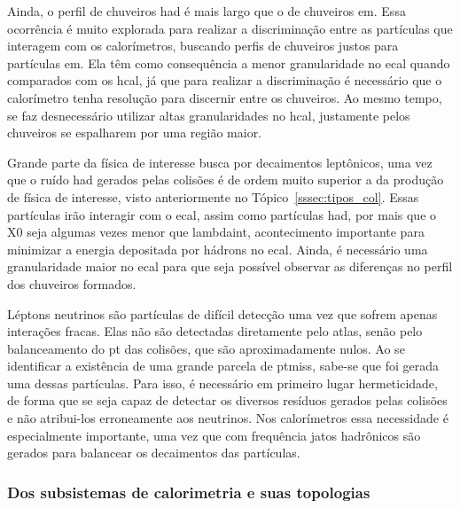 Ainda, o perfil de chuveiros \gls{had} é mais largo que o de chuveiros
\gls{em}. Essa ocorrência é muito explorada para realizar a discriminação 
entre as partículas que interagem com os calorímetros, buscando perfis de chuveiros
justos para partículas \gls{em}. Ela têm como consequência 
a menor granularidade no \gls{ecal} quando comparados com os \gls{hcal}, já que
para realizar a discriminação é necessário que o calorímetro tenha resolução
para discernir entre os chuveiros. Ao mesmo tempo, se faz desnecessário
utilizar altas granularidades no \gls{hcal}, justamente pelos chuveiros se
espalharem por uma região maior.

Grande parte da física de interesse busca por decaimentos
leptônicos, uma vez que o ruído \gls{had} gerados pelas colisões é de ordem
muito superior a da produção de física de interesse, visto anteriormente no
Tópico~\ref{sssec:tipos_col}. Essas partículas irão interagir com o \gls{ecal},
assim como partículas \gls{had}, por mais que o \gls{X0} seja algumas vezes 
menor que \gls{lambdaint}, acontecimento importante para minimizar a energia depositada
por hádrons no \gls{ecal}. Ainda, é necessário uma granularidade 
maior no \gls{ecal} para que seja possível observar as diferenças no 
perfil dos chuveiros formados.

Léptons neutrinos são partículas de difícil detecção uma vez que sofrem 
apenas interações fracas. Elas não são detectadas diretamente pelo 
\gls{atlas}, senão pelo balanceamento do \gls{pt} das colisões, que são 
aproximadamente nulos. Ao se identificar a existência de uma grande parcela de 
\gls{ptmiss}, sabe-se que foi gerada uma dessas partículas. Para isso, é necessário em
primeiro lugar hermeticidade, de forma que se seja capaz de
detectar os diversos resíduos gerados pelas colisões e não atribui-los erroneamente aos neutrinos. 
Nos calorímetros essa necessidade é especialmente importante, uma vez que com frequência 
jatos hadrônicos são gerados para balancear os decaimentos das partículas.

\subsubsection{Dos subsistemas de calorimetria e suas topologias}
\label{sssec:cal_estrutura}


